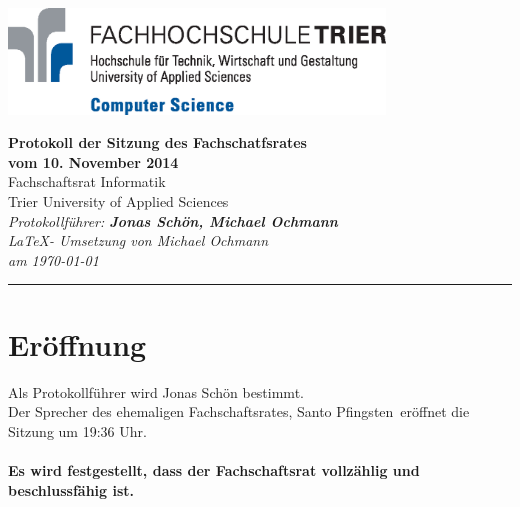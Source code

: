 \documentclass[a4paper, 11pt]{article} %
\newcommand{\protokoller}{Jonas Schön, Michael Ochmann}
\newcommand{\dateOfMeeting}{10. November 2014}
\newcommand{\TeXer}{Michael Ochmann}
\newcommand{\fsiPresident}{Santo Pfingsten}
\begin{document}

\doublespacing
\thispagestyle{empty}

\begin{center}
\includegraphics[width=10.0cm]{../logo_faculty_computer_science.eps}

\vspace*{\fill}
{\LARGE \textbf{Protokoll der Sitzung des Fachschatfsrates \\vom \dateOfMeeting}}\\
Fachschaftsrat Informatik\\
Trier University of Applied Sciences\\
\vspace{2.5cm}
\textit{
	Protokollführer: \textbf{\protokoller} \\
	\LaTeX - Umsetzung von \TeXer\\
	am \today
}
\vfill
\end{center}

\hspace*{-35cm}
\textcolor{fsi}{\rule{64.9cm}{15pt}}
\pagebreak
 
\setcounter{tocdepth}{2}
\tableofcontents 
\pagebreak

\section{Eröffnung}
Als Protokollführer wird Jonas Schön bestimmt.\\
Der Sprecher des ehemaligen Fachschaftsrates, \fsiPresident~eröffnet die Sitzung um 19:36 Uhr.
\\\\
\textbf{Es wird festgestellt, dass der Fachschaftsrat vollzählig und beschlussfähig ist.}
\end{document}
